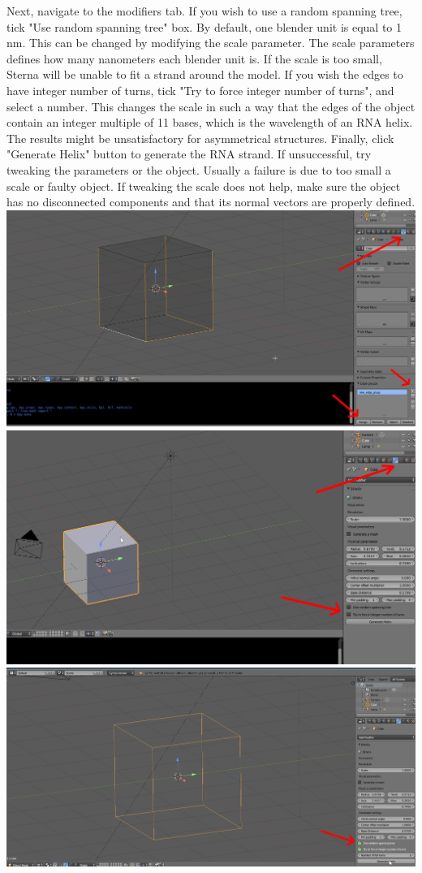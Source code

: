    Next, navigate to the modifiers tab. If you wish to use a random spanning tree, tick "Use random spanning tree" box.
    By default, one blender unit is equal to 1 nm. This can be changed by modifying the scale parameter. The scale parameters defines how many nanometers each blender unit is. If the scale is too small, Sterna will be unable to fit a strand around the model.
    If you wish the edges to have integer number of turns, tick "Try to force integer number of turns", and select a number. This changes the scale in such a way that the edges of the object contain an integer multiple of 11 bases, which is the wavelength of an RNA helix. The results might be unsatisfactory for asymmetrical structures.
    Finally, click "Generate Helix" button to generate the RNA strand. If unsuccessful, try tweaking the parameters or the object. Usually a failure is due to too small a scale or faulty object. If tweaking the scale does not help, make sure the object has no disconnected components and that its normal vectors are properly defined.
    \includegraphics[width=\textwidth]{images/Sterna_4}
    \includegraphics[width=\textwidth]{images/Sterna_5}
    \includegraphics[width=\textwidth]{images/Sterna_7}
